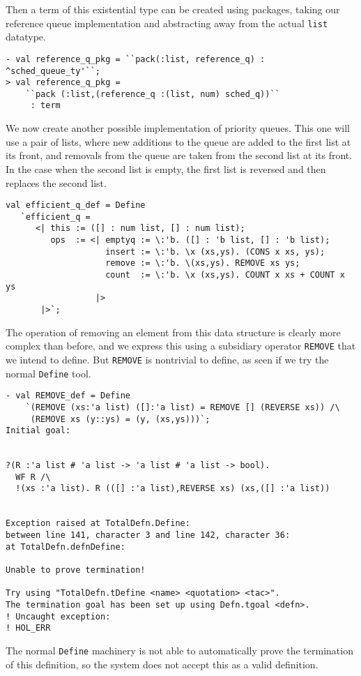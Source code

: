 Then a term of this existential type can be created using packages,
taking our reference queue implementation and abstracting away
from the actual {\tt list} datatype.
\begin{session}
\begin{verbatim}
- val reference_q_pkg = ``pack(:list, reference_q) : ^sched_queue_ty'``;
> val reference_q_pkg =
    ``pack (:list,(reference_q :(list, num) sched_q))``
     : term
\end{verbatim}
\end{session}
We now create another possible implementation of priority queues. This
one will use a pair of lists, where new additions
to the queue are added to the first list at its front, and removals
from the queue are taken from the second list at its front.
In the case when the second list is empty, the first list is
reversed and then replaces the second list.
\begin{verbatim}
val efficient_q_def = Define
   `efficient_q =
      <| this := ([] : num list, [] : num list);
         ops  := <| emptyq := \:'b. ([] : 'b list, [] : 'b list);
                    insert := \:'b. \x (xs,ys). (CONS x xs, ys);
                    remove := \:'b. \(xs,ys). REMOVE xs ys;
                    count  := \:'b. \x (xs,ys). COUNT x xs + COUNT x ys
                  |>
       |>`;
\end{verbatim}
\noindent
The operation of removing an element from this data structure is
clearly more complex than before, and we express this using a subsidiary
operator {\tt REMOVE} that we intend to define. But {\tt REMOVE}
is nontrivial to define, as seen if we try the normal {\tt Define}
tool.
\begin{session}
\begin{verbatim}
- val REMOVE_def = Define
    `(REMOVE (xs:'a list) ([]:'a list) = REMOVE [] (REVERSE xs)) /\
     (REMOVE xs (y::ys) = (y, (xs,ys)))`;
Initial goal:


?(R :'a list # 'a list -> 'a list # 'a list -> bool).
  WF R /\
  !(xs :'a list). R (([] :'a list),REVERSE xs) (xs,([] :'a list))


Exception raised at TotalDefn.Define:
between line 141, character 3 and line 142, character 36:
at TotalDefn.defnDefine:

Unable to prove termination!

Try using "TotalDefn.tDefine <name> <quotation> <tac>".
The termination goal has been set up using Defn.tgoal <defn>.
! Uncaught exception: 
! HOL_ERR
\end{verbatim}
\end{session}
\noindent
The normal {\tt Define} machinery is not able to automatically prove 
the termination of this definition, so the system does not accept this
as a valid definition.

